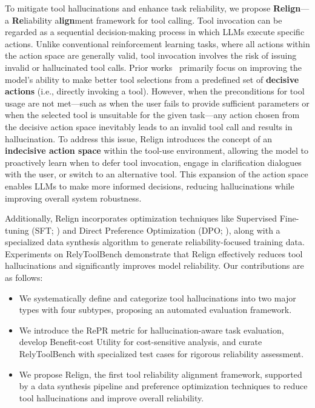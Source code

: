 To mitigate tool hallucinations and enhance task reliability, we propose \textbf{Relign}—a \textbf{Re}liability a\textbf{lign}ment framework for tool calling. Tool invocation can be regarded as a sequential decision-making process in which LLMs execute specific actions. Unlike conventional reinforcement learning tasks, where all actions within the action space are generally valid, tool invocation involves the risk of issuing invalid or hallucinated tool calls. Prior works~\cite{qin2023toolllm, yu2024steptool} primarily focus on improving the model’s ability to make better tool selections from a predefined set of \textbf{decisive actions} (i.e., directly invoking a tool). However, when the preconditions for tool usage are not met—such as when the user fails to provide sufficient parameters or when the selected tool is unsuitable for the given task—any action chosen from the decisive action space inevitably leads to an invalid tool call and results in hallucination. To address this issue, Relign introduces the concept of an \textbf{indecisive action space} within the tool-use environment, allowing the model to proactively learn when to defer tool invocation, engage in clarification dialogues with the user, or switch to an alternative tool. This expansion of the action space enables LLMs to make more informed decisions, reducing hallucinations while improving overall system robustness.

Additionally, Relign incorporates optimization techniques like Supervised Fine-tuning (SFT; \citealp{zhang2023instruction}) and Direct Preference Optimization (DPO; \citealp{rafailov2024direct}), along with a specialized data synthesis algorithm to generate reliability-focused training data. Experiments on RelyToolBench demonstrate that Relign effectively reduces tool hallucinations and significantly improves model reliability. Our contributions are as follows:
\begin{itemize}
\item We systematically define and categorize tool hallucinations into two major types with four subtypes, proposing an automated evaluation framework.
\item We introduce the RePR metric for hallucination-aware task evaluation, develop Benefit-cost Utility for cost-sensitive analysis, and curate RelyToolBench with specialized test cases for rigorous reliability assessment.
\item We propose Relign, the first tool reliability alignment framework, supported by a data synthesis pipeline and preference optimization techniques to reduce tool hallucinations and improve overall reliability.
\end{itemize}